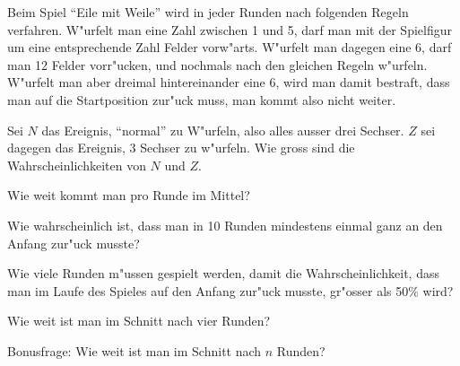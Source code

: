 Beim Spiel ``Eile mit Weile'' wird in jeder Runden nach folgenden Regeln
verfahren.
W"urfelt man eine Zahl zwischen 1 und 5, darf man mit der Spielfigur
um eine entsprechende Zahl Felder vorw"arts. W"urfelt man dagegen
eine 6, darf man 12 Felder vorr"ucken, und nochmals nach den
gleichen Regeln w"urfeln. W"urfelt man aber dreimal hintereinander
eine 6, wird man damit bestraft, dass man auf die Startposition
zur"uck muss, man kommt also nicht weiter.
\begin{teilaufgaben}
\item Sei $N$ das Ereignis, ``normal'' zu W"urfeln, also alles ausser drei
Sechser. $Z$ sei dagegen das Ereignis, 3 Sechser zu w"urfeln. Wie gross
sind die Wahrscheinlichkeiten von $N$ und $Z$.
\item Wie weit kommt man pro Runde im Mittel?
\item Wie wahrscheinlich ist, dass man in 10 Runden mindestens einmal
ganz an den Anfang zur"uck musste?
\item Wie viele Runden m"ussen gespielt werden, damit die Wahrscheinlichkeit,
dass man im Laufe des Spieles auf den Anfang zur"uck musste, gr"osser als 50\%
wird?
\item Wie weit ist man im Schnitt nach vier Runden?
\item Bonusfrage: Wie weit ist man im Schnitt nach $n$ Runden?
\end{teilaufgaben}

